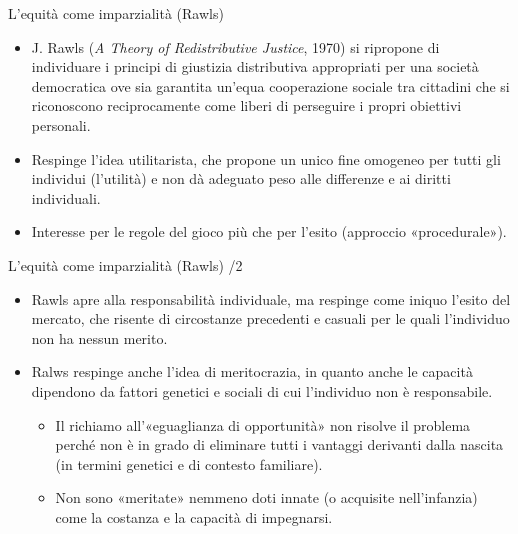 \documentclass[aspectratio=64,12pt]{beamer}
\begin{document}
\begin{frame}{L'equità come imparzialità (Rawls)}
\begin{itemize}
\item J. Rawls (\emph{A Theory of Redistributive Justice}, 1970) si ripropone di
  individuare i principi di giustizia distributiva appropriati per una società
  democratica ove sia garantita un'equa cooperazione sociale tra cittadini che
  si riconoscono reciprocamente come liberi di perseguire i propri obiettivi
  personali.
\item Respinge l'idea utilitarista, che propone un unico fine omogeneo per tutti
gli individui (l'utilità) e non dà adeguato peso alle differenze e ai diritti individuali.
\item Interesse per le regole del gioco più che per l'esito (approccio
«procedurale»).
\end{itemize}
\end{frame}

\begin{frame}{L'equità come imparzialità (Rawls) /2}
\begin{itemize}
\item Rawls apre alla responsabilità individuale, ma respinge come iniquo l'esito
del mercato, che risente di circostanze precedenti e casuali per le quali
l'individuo non ha nessun merito.
\item Ralws respinge anche l'idea di \alert{meritocrazia}, in quanto anche le capacità
dipendono da fattori genetici e sociali di cui l'individuo non è responsabile.
\begin{itemize}
\item Il richiamo all'«eguaglianza di opportunità» non risolve il problema
perché non è in grado di eliminare tutti i vantaggi derivanti dalla
nascita (in termini genetici e di contesto familiare).
\item Non sono «meritate» nemmeno doti innate (o acquisite nell'infanzia) come
  la costanza e la capacità di impegnarsi.
\end{itemize}
\end{itemize}
\end{frame}
\end{document}
